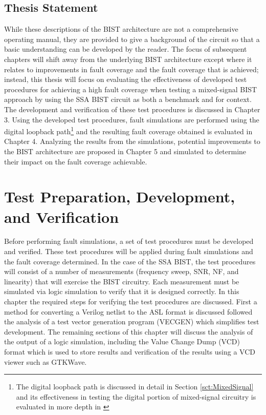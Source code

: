 \documentclass[12pt]{report}
\begin{document}
\section{Thesis Statement}
While these descriptions of the BIST architecture are not a comprehensive operating manual, they are provided to give a background of the circuit so that a basic understanding can be developed by the reader.  The focus of subsequent chapters will shift away from the underlying BIST architecture except where it relates to improvements in fault coverage and the fault coverage that is achieved; instead, this thesis will focus on evaluating the effectiveness of developed test procedures for achieving a high fault coverage when testing a mixed-signal BIST approach by using the SSA BIST circuit as both a benchmark and for context.  The development and verification of these test procedures is discussed in Chapter 3.  Using the developed test procedures, fault simulations are performed using the digital loopback path\footnote{The digital loopback path is discussed in detail in Section \ref{sct:MixedSignal} and its effectiveness in testing the digital portion of mixed-signal circuitry is evaluated in more depth in \cite{stroud-analog}} and the resulting fault coverage obtained is evaluated in Chapter 4.  Analyzing the results from the simulations, potential improvements to the BIST architecture are proposed in Chapter 5 and simulated to determine their impact on the fault coverage achievable.  

\chapter{Test Preparation, Development, and Verification}
Before performing fault simulations, a set of test procedures must be developed and verified.  These test procedures will be applied during fault simulations and the fault coverage determined.  In the case of the SSA BIST, the test procedures will consist of a number of measurements (frequency sweep, SNR, NF, and linearity) that will exercise the BIST circuitry.  Each measurement must be simulated via logic simulation to verify that it is designed correctly.  In this chapter the required steps for verifying the test procedures are discussed.  First a method for converting a Verilog netlist to the ASL format is discussed followed the analysis of a test vector generation program (VECGEN) which simplifies test development.  The remaining sections of this chapter will discuss the analysis of the output of a logic simulation, including the Value Change Dump (VCD) format which is used to store results and verification of the results using a VCD viewer such as GTKWave.
\end{document}
